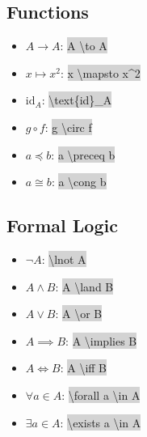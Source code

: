 \documentclass[12pt]{article}
\theoremstyle{definition}
\newcommand{\ltc}[1]{\colorbox{lightgray}{\textbackslash #1}}
\newcommand{\ltcc}[1]{\colorbox{lightgray}{#1}}
\begin{document}
	\subsection{Functions}
	\begin{multicols}{2}
 	\begin{itemize}
	 	\item $A \to A$: \ltcc{A \textbackslash to A}
	 	\item $x \mapsto x^2$: \ltcc{x \textbackslash mapsto x\^{}2}
	 	\item $\text{id}_A$: \ltc{text\{id\}\_A}
	 	\item $g \circ f$: \ltcc{g \textbackslash circ f}
 	\end{itemize}	
 	\end{multicols}
 	
 	\begin{multicols}{2}
 	\begin{itemize}
	 	\item $a \preceq b$: \ltcc{a \textbackslash preceq b}
	 	\item $a \cong b$: \ltcc{a \textbackslash cong b}
 	\end{itemize}	
 	\end{multicols}
 	
 	\subsection{Formal Logic}
 	\begin{multicols}{2}
 	\begin{itemize}
	 	\item $\lnot A$: \ltc{lnot A}
	 	\item $A \land B$: \ltcc{A \textbackslash land B}
	 	\item $A \lor B$: \ltcc{A \textbackslash or B}
	 	\item $A \implies B$: \ltcc{A \textbackslash implies B}
	 	\item $A \iff B$: \ltcc{A \textbackslash iff B}
	 	\item $\forall a \in A$: \ltc{forall a \textbackslash in A}
	 	\item $\exists a \in A$: \ltc{exists a \textbackslash in A}
 	\end{itemize}	
 	\end{multicols}
 	
\end{document}
